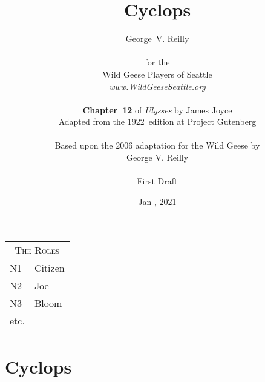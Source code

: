 


\title{\Huge Cyclops}
\author{George~V. Reilly\\
\\
{\small for the}\\
Wild Geese Players of Seattle\\
{\textit{www.WildGeeseSeattle.org}}\\
\\
{\small \textbf{Chapter~12} of \textit{Ulysses} by James Joyce}\\
{\small Adapted from the 1922~edition at Project Gutenberg}
\\
\\
{\small Based upon the 2006 adaptation for the Wild Geese by}\\
{\small George V. Reilly}\\
\\
{\small First Draft}}
\date{Jan , 2021}
\raggedbottom



\maketitle
\thispagestyle{empty}
\pagebreak

\begin{tabular}{lp{10cm}}
    \multicolumn{2}{c}{\Large \textsc{The Roles}} \\
N1              & Citizen \\
N2              & Joe \\
N3              & Bloom \\
etc.
\end{tabular}

\thispagestyle{empty}
\newpage


\setcounter{page}{1}

\section*{Cyclops}




